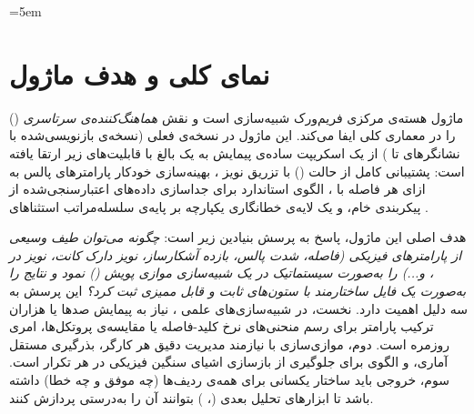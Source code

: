 \sloppy
\emergencystretch=5em



\section{نمای کلی و هدف ماژول}

ماژول  هسته‌ی مرکزی فریم‌ورک شبیه‌سازی  است و نقش \emph{هماهنگ‌کننده‌ی سرتاسری} () را در معماری کلی ایفا می‌کند. این ماژول در نسخه‌ی فعلی (نسخه‌ی بازنویسی‌شده با نشانگرهای  تا ) از یک اسکریپت ساده‌ی پیمایش  به یک  بالغ با قابلیت‌های زیر ارتقا یافته است: پشتیبانی کامل از حالت  () با تزریق نویز ، بهینه‌سازی خودکار پارامترهای پالس به ازای هر فاصله با ، الگوی استاندارد  برای جداسازی داده‌های اعتبارسنجی‌شده از پیکربندی خام، و یک لایه‌ی خطا‌‌نگاری یکپارچه بر پایه‌ی سلسله‌مراتب استثناهای .

هدف اصلی این ماژول، پاسخ به پرسش بنیادین زیر است: \emph{چگونه می‌توان طیف وسیعی از پارامترهای فیزیکی (فاصله، شدت پالس، بازده آشکارساز، نویز دارک کانت، نویز  در ، و...) را به‌صورت سیستماتیک در یک شبیه‌سازی موازی پویش () نمود و نتایج را به‌صورت یک فایل  ساختارمند با ستون‌های ثابت و قابل ممیزی ثبت کرد؟} این پرسش به سه دلیل اهمیت دارد. نخست، در شبیه‌سازی‌های علمی ، نیاز به پیمایش صدها یا هزاران ترکیب پارامتر برای رسم منحنی‌های نرخ کلید-فاصله یا مقایسه‌ی پروتکل‌ها، امری روزمره است. دوم، موازی‌سازی با  نیازمند مدیریت دقیق  هر کارگر، بذرگیری مستقل آماری، و الگوی  برای جلوگیری از بازسازی اشیای سنگین فیزیکی در هر تکرار است. سوم، خروجی  باید ساختار یکسانی برای همه‌ی ردیف‌ها (چه موفق و چه خطا) داشته باشد تا ابزارهای تحلیل بعدی (، ) بتوانند آن را به‌درستی پردازش کنند.


